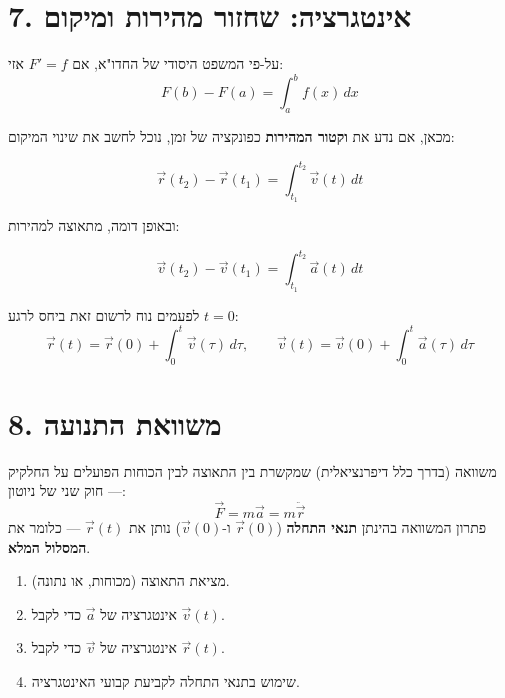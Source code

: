 \documentclass[12pt, a4paper]{article}
\newcommand{\hvec}[1]{\overrightarrow{#1}}
\begin{document}
\section*{7. אינטגרציה: שחזור מהירות ומיקום}

על-פי המשפט היסודי של החדו"א, אם \textenglish{$F' = f$} אזי:
\[
  F(b) - F(a) = \int_a^b f(x)\,dx
\]

מכאן, אם נדע את \textbf{וקטור המהירות} כפונקציה של זמן, נוכל לחשב את שינוי המיקום:

\begin{tcolorbox}[resultbox]
\[
  \hvec{r}(t_2) - \hvec{r}(t_1) = \int_{t_1}^{t_2} \hvec{v}(t)\,dt
\]
\end{tcolorbox}

ובאופן דומה, מתאוצה למהירות:

\begin{tcolorbox}[resultbox]
\[
  \hvec{v}(t_2) - \hvec{v}(t_1) = \int_{t_1}^{t_2} \hvec{a}(t)\,dt
\]
\end{tcolorbox}

\medskip

לפעמים נוח לרשום זאת ביחס לרגע \textenglish{$t=0$}:
\[
  \hvec{r}(t) = \hvec{r}(0) + \int_0^t \hvec{v}(\tau)\,d\tau,
  \qquad
  \hvec{v}(t) = \hvec{v}(0) + \int_0^t \hvec{a}(\tau)\,d\tau
\]

\section*{8. משוואת התנועה}

\begin{tcolorbox}[defbox, title={משוואת התנועה}]
משוואה (בדרך כלל דיפרנציאלית) שמקשרת בין התאוצה לבין הכוחות הפועלים על החלקיק --- חוק שני של ניוטון:
\[
  \hvec{F} = m\hvec{a} = m\ddot{\hvec{r}}
\]
פתרון המשוואה בהינתן \textbf{תנאי התחלה} (\textenglish{$\hvec{r}(0)$} ו-\textenglish{$\hvec{v}(0)$}) נותן את \textenglish{$\hvec{r}(t)$} --- כלומר את \textbf{המסלול המלא}.
\end{tcolorbox}

\begin{tcolorbox}[notebox, title={מבנה כללי של בעיה בקינמטיקה}]
\begin{enumerate}
  \item מציאת התאוצה (מכוחות, או נתונה).
  \item אינטגרציה של \textenglish{$\hvec{a}$} כדי לקבל \textenglish{$\hvec{v}(t)$}.
  \item אינטגרציה של \textenglish{$\hvec{v}$} כדי לקבל \textenglish{$\hvec{r}(t)$}.
  \item שימוש בתנאי התחלה לקביעת קבועי האינטגרציה.
\end{enumerate}
\end{tcolorbox}
\end{document}
